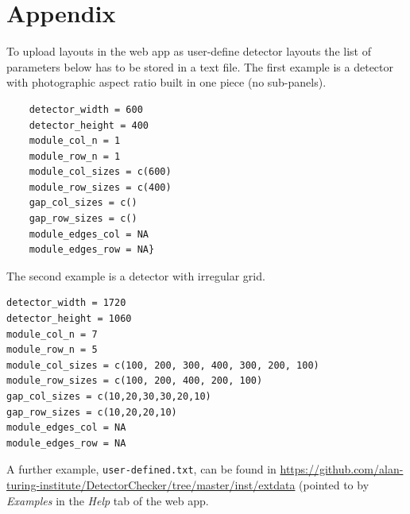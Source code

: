 \documentclass[11pt,a4paper]{article}
\begin{document}
\section{Appendix}\label{appendix}

To upload layouts in the web app as user-define detector layouts the list of parameters below has to be stored in a text file. The first example is a detector with photographic aspect ratio built in one piece (no sub-panels).

\begin{verbatim}
	detector_width = 600
	detector_height = 400
	module_col_n = 1
	module_row_n = 1
	module_col_sizes = c(600)
	module_row_sizes = c(400)
	gap_col_sizes = c()
	gap_row_sizes = c()
	module_edges_col = NA
	module_edges_row = NA}
\end{verbatim}
	
The second example is a detector with irregular grid. 

\begin{verbatim}
detector_width = 1720
detector_height = 1060
module_col_n = 7
module_row_n = 5
module_col_sizes = c(100, 200, 300, 400, 300, 200, 100)
module_row_sizes = c(100, 200, 400, 200, 100)
gap_col_sizes = c(10,20,30,30,20,10)
gap_row_sizes = c(10,20,20,10)
module_edges_col = NA
module_edges_row = NA
\end{verbatim}

 A further example, \texttt{user-defined.txt}, can be found in
\url{https://github.com/alan-turing-institute/DetectorChecker/tree/master/inst/extdata} (pointed to by \emph{Examples} in the \emph{Help} tab of the web app.
\end{document}
